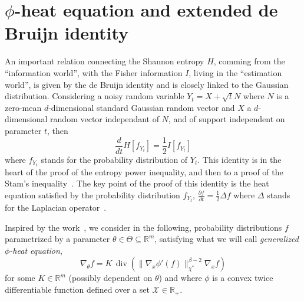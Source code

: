 \documentclass[english,sort&compress]{elsarticle}
\theoremstyle{definition}
\theoremstyle{plain}
\theoremstyle{plain}
\def\Rset{\mathbb{R}}
\def\X{\mathcal{X}}
\def\div{\operatorname{div}}
\begin{document}

\section{$\phi$-heat equation and extended de Bruijn identity}
\label{sec:deBruijn}


An  important relation  connecting the  Shannon  entropy $H$,  comming from  the
``information  world'',  with   the  Fisher  information  $I$,   living  in  the
``estimation world'', is  given by the de Bruijn identity  and is closely linked
to the  Gaussian distribution. Considering  a noisy random  variable $Y_t =  X +
\sqrt{t} N$  where $N$ is  a zero-mean $d$-dimensional standard  Gaussian random
vector  and $X$  a  $d$-dimensional random  vector independant  of  $N$, and  of
support independent on  parameter $t$, then $$\frac{d}{dt}  H[f_{Y_t}] = \frac12
I[f_{Y_t}]$$ where $f_{Y_t}$  stands for the probability  distribution of $Y_t$.
This identity is in the heart of  the proof of the entropy power inequality, and
then to a proof of the  Stam's inequality~\cite{CovTho06}.  The key point of the
proof  of this  identity  is  the heat  equation  satisfied  by the  probability
distribution $f_{Y_t}$, $\frac{\partial f}{\partial t} = \frac12 \Delta f$ where
$\Delta$ stands for the Laplacian operator~\cite{Wid75}.

Inspired by the work~\cite{Ber13:08},  we consider in the following, probability
distributions  $f$ parametrized  by  a parameter  $\theta  \in \Theta  \subseteq
\Rset^m$, satisfying what we will call {\em generalized $\phi$-heat equation},
%
\begin{equation}
\label{eq:phi-heat_equation}
\nabla_\theta f = K \, \div\left( \| \nabla_x \phi'(f) \|_{\chi^*}^{\beta-2}
\nabla_x f \right)
\end{equation}
%
for some $K \in \Rset^m$ (possibly  dependent on $\theta$) and where $\phi$ is a
convex  twice differentiable  function  defined  over a  set  $\X \in  \Rset_+$.
\end{document}
